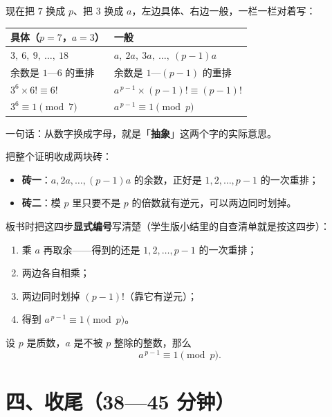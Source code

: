 现在把 \(7\) 换成 \(p\)、把 \(3\) 换成 \(a\)，左边具体、右边一般，一栏一栏对着写：

\begin{center}
\begin{tabular}{@{}ll@{}}
  \toprule
  \textbf{具体}（\(p=7\)，\(a=3\)） & \textbf{一般} \\
  \midrule
  \(3,\ 6,\ 9,\ \dots,\ 18\) & \(a,\ 2a,\ 3a,\ \dots,\ (p-1)a\) \\
  余数是 \(1\text{—}6\) 的重排 & 余数是 \(1\text{—}(p-1)\) 的重排 \\
  \(3^{6}\times6!\equiv6!\) & \(a^{\,p-1}\times(p-1)!\equiv(p-1)!\) \\
  \(3^{6}\equiv1 \pmod 7\) & \(a^{\,p-1}\equiv1 \pmod p\) \\
  \bottomrule
\end{tabular}
\end{center}

一句话：从数字换成字母，就是「\textbf{抽象}」这两个字的实际意思。

把整个证明收成两块砖：

\begin{itemize}
  \item \textbf{砖一}：\(a,2a,\dots,(p-1)a\) 的余数，正好是 \(1,2,\dots,p-1\) 的一次重排；
  \item \textbf{砖二}：模 \(p\) 里只要不是 \(p\) 的倍数就有逆元，可以两边同时划掉。
\end{itemize}

\begin{zhu}
  板书时把这四步\textbf{显式编号}写清楚（学生版小结里的自查清单就是按这四步）：
  \begin{enumerate}
    \item 乘 \(a\) 再取余——得到的还是 \(1,2,\dots,p-1\) 的一次重排；
    \item 两边各自相乘；
    \item 两边同时划掉 \((p-1)!\)（靠它有逆元）；
    \item 得到 \(a^{\,p-1}\equiv1\pmod p\)。
  \end{enumerate}
\end{zhu}

\begin{dingli}[费马小定理]
  设 \(p\) 是质数，\(a\) 是不被 \(p\) 整除的整数，那么
  \[
    a^{\,p-1}\equiv1 \pmod p .
  \]
\end{dingli}

\section*{四、收尾（38—45 分钟）}

